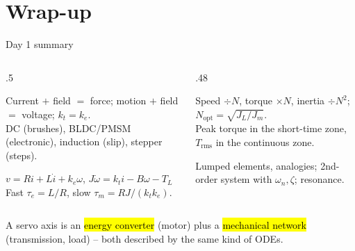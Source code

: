\documentclass[aspectratio=169,10pt]{beamer}
\begin{document}
\section*{Wrap-up}
\begin{frame}{Day 1 summary}
\begin{columns}[T]
\begin{column}{.5\textwidth}
\small
\begin{defbox}[Machines]
Current $+$ field $=$ force; motion $+$ field $=$ voltage; $k_t=k_e$.\\
DC (brushes), BLDC/PMSM (electronic), induction (slip), stepper (steps).
\end{defbox}
\begin{defbox}[Models]
$v=Ri+L\dot i+k_e\omega$, \; $J\dot\omega=k_ti-B\omega-T_L$\\
Fast $\tau_e=L/R$, slow $\tau_m=RJ/(k_tk_e)$.
\end{defbox}
\end{column}
\begin{column}{.48\textwidth}
\small
\begin{defbox}
Speed $\div N$, torque $\times N$, inertia $\div N^2$; $N_\text{opt}=\sqrt{J_L/J_m}$.\\
Peak torque in the short-time zone, $T_\text{rms}$ in the continuous zone.
\end{defbox}
\begin{defbox}
Lumped elements, analogies; 2nd-order system with $\omega_n,\zeta$; resonance.
\end{defbox}
\end{column}
\end{columns}
\vspace{2mm}
\begin{keybox}
A servo axis is an \hl{energy converter} (motor) plus a \hl{mechanical network} (transmission, load) -- both described by the same kind of ODEs.
\end{keybox}
\end{frame}
\end{document}
